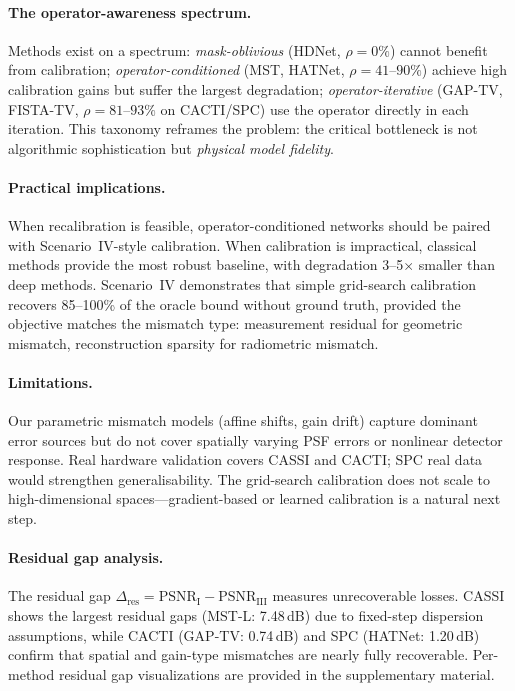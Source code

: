 \documentclass[runningheads]{llncs}
\begin{document}
\paragraph{The operator-awareness spectrum.}
Methods exist on a spectrum: \emph{mask-oblivious} (HDNet, $\rho{=}0\%$) cannot benefit from calibration; \emph{operator-conditioned} (MST, HATNet, $\rho{=}41$--$90\%$) achieve high calibration gains but suffer the largest degradation; \emph{operator-iterative} (GAP-TV, FISTA-TV, $\rho{=}81$--$93\%$ on CACTI/SPC) use the operator directly in each iteration.
This taxonomy reframes the problem: the critical bottleneck is not algorithmic sophistication but \emph{physical model fidelity}.

\paragraph{Practical implications.}
When recalibration is feasible, operator-conditioned networks should be paired with Scenario~IV-style calibration.
When calibration is impractical, classical methods provide the most robust baseline, with degradation 3--5$\times$ smaller than deep methods.
Scenario~IV demonstrates that simple grid-search calibration recovers 85--100\% of the oracle bound without ground truth, provided the objective matches the mismatch type: measurement residual for geometric mismatch, reconstruction sparsity for radiometric mismatch.

\paragraph{Limitations.}
Our parametric mismatch models (affine shifts, gain drift) capture dominant error sources but do not cover spatially varying PSF errors or nonlinear detector response.
Real hardware validation covers CASSI and CACTI; SPC real data would strengthen generalisability.
The grid-search calibration does not scale to high-dimensional spaces---gradient-based or learned calibration is a natural next step.

\paragraph{Residual gap analysis.}
The residual gap $\Delta_{\text{res}} = \text{PSNR}_{\text{I}} - \text{PSNR}_{\text{III}}$ measures unrecoverable losses.
CASSI shows the largest residual gaps (MST-L: 7.48\,dB) due to fixed-step dispersion assumptions, while CACTI (GAP-TV: 0.74\,dB) and SPC (HATNet: 1.20\,dB) confirm that spatial and gain-type mismatches are nearly fully recoverable.
Per-method residual gap visualizations are provided in the supplementary material.
\end{document}
